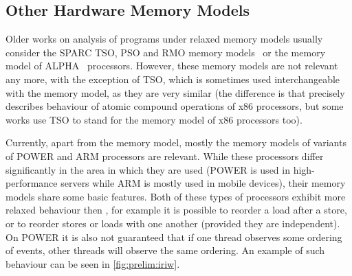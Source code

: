 \subsection{Other Hardware Memory Models}


Older works on analysis of programs under relaxed memory models usually
consider the SPARC TSO, PSO and RMO memory models~\cite{SPARC94} or the memory
model of ALPHA~\cite{mckenney2010} processors.
However, these memory models are not relevant any more, with the exception of
TSO, which is sometimes used interchangeable with the \xtso memory model, as
they are very similar (the difference is that \xtso precisely describes
behaviour of atomic compound operations of x86 processors, but some works use
TSO to stand for the memory model of x86 processors too).

Currently, apart from the \xtso memory model, mostly the memory models of
variants of POWER and ARM processors are relevant.
While these processors differ significantly in the area in which they are used
(POWER is used in high-performance servers while ARM is mostly used in mobile
devices), their memory models share some basic features.
Both of these types of processors exhibit more relaxed behaviour then \xtso,
for example it is possible to reorder a load after a store, or to reorder
stores or loads with one another (provided they are independent).
On POWER it is also not guaranteed that if one thread observes some ordering of
events, other threads will observe the same ordering.
An example of such behaviour can be seen in \autoref{fig:prelim:iriw}.

